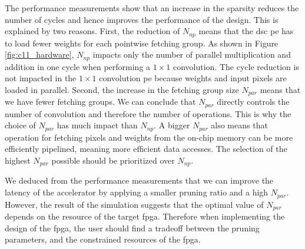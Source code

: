 The performance measurements show that an increase in the sparsity reduces the number of cycles and hence improves the performance of the design. This is explained by two reasons. First, the reduction of $N_{np}$ means that the \acrshort{dsc} \acrshort{pe} has to load fewer weights for each pointwise fetching group. As shown in Figure \ref{fig:c11_hardware}, $N_{np}$ impacts only the number of parallel multiplication and addition in one cycle when performing a $1 \times 1$ convolution. The cycle reduction is not impacted in the $1 \times 1$ convolution \acrshort{pe} because weights and input pixels are loaded in parallel. Second, the increase in the fetching group size $N_{par}$ means that we have fewer fetching groups. We can conclude that $N_{par}$ directly controls the number of convolution and therefore the number of operations. This is why the choice of $N_{par}$ has much impact than $N_{np}$. A bigger $N_{par}$ also means that operation for fetching pixels and weights from the on-chip memory can be more efficiently pipelined, meaning more efficient data accesses. The selection of the highest $N_{par}$ possible should be prioritized over $N_{np}$.

We deduced from the performance measurements that we can improve the latency of the accelerator by applying a smaller pruning ratio and a high $N_{par}$. However, the result of the simulation suggests that the optimal value of $N_{par}$ depends on the resource of the target \acrshort{fpga}. Therefore when implementing the design of the \acrshort{fpga}, the user should find a tradeoff between the pruning parameters, and the constrained resources of the \acrshort{fpga}.
